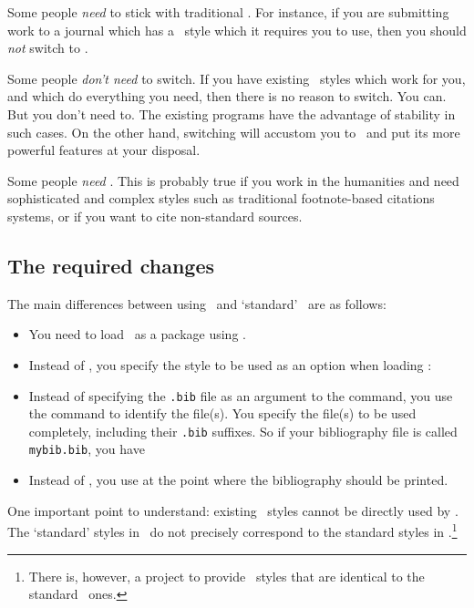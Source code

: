 Some people \emph{need} to stick with traditional \bibtex. For instance, if you are submitting work to a journal which has a \bibtex\ style which it requires you to use, then you should \emph{not} switch to \biblatex.

Some people \emph{don't need} to switch. If you have existing \bibtex\ styles which work for you, and which do everything you need, then there is no reason to switch. You can. But you don't need to. The existing programs have the advantage of stability in such cases. On the other hand, switching will accustom you to \biblatex\ and put its more powerful features at your disposal.

Some people \emph{need} \biblatex. This is probably true if you work in the humanities and need sophisticated and complex styles such as traditional footnote-based citations systems, or if you want to cite non-standard sources.

\subsection{The required changes}

The main differences between using \biblatex\ and `standard' \bibtex\ are as follows:

\begin{itemize}
\item You need to load \biblatex\ as a package using .
\item Instead of , you specify the style to be used as an option when loading \biblatex:\\
\centerline{}
\item Instead of specifying the \verb|.bib| file as an argument to the  command, you use the command  to identify the file(s). You specify the file(s) to be used completely, including their \verb|.bib| suffixes. So if your bibliography file is called \verb|mybib.bib|, you have\\
\centerline{}
\item Instead of , you use  at the point where the bibliography should be printed.
\end{itemize}

One important point to understand: existing \bibtex\ styles cannot be directly used by \biblatex. The `standard' styles in \biblatex\ do not precisely correspond to the standard styles in \bibtex.\footnote{There is, however, a project to provide \biblatex\ styles that are identical to the standard \bibtex\ ones.}

